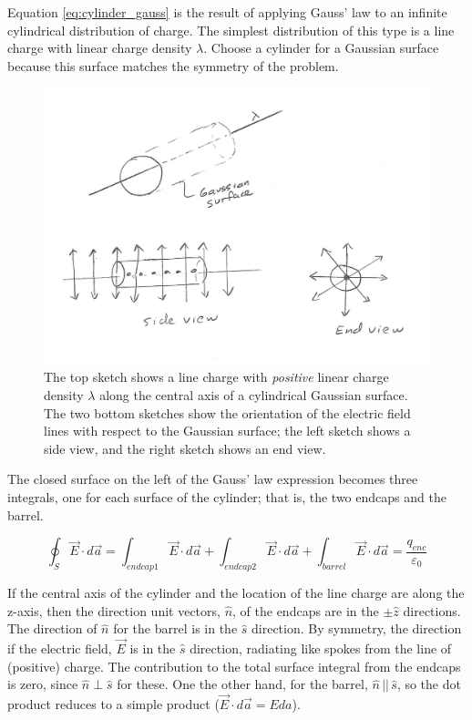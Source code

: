\documentclass[12pt]{article}
\begin{document}
\begin{flushleft}
Equation \ref{eq:cylinder_gauss} is the result of applying Gauss' law to an infinite cylindrical distribution of charge.  The simplest distribution of this type is a line charge with linear charge density $\lambda$.  Choose a cylinder for a Gaussian surface because this surface matches the symmetry of the problem.

\begin{figure}[h]
\centering
\includegraphics*[trim=1cm 0cm 0cm 0cm, clip=true, width=0.6\columnwidth]{linecharge.png}
\caption{\small The top sketch shows a line charge with {\it positive} linear charge density $\lambda$ along the central axis of a cylindrical Gaussian surface.  The two bottom sketches show the orientation of the electric field lines with respect to the Gaussian surface; the left sketch shows a side view, and the right sketch shows an end view.}
\label{fig:linecharge}
\end{figure}

The closed surface on the left of the Gauss' law expression becomes three integrals, one for each surface of the cylinder; that is, the two endcaps and the barrel.

\begin{equation*}
\oint_{S} \vec{E} \cdot d\vec{a} = \int_{endcap1} \vec{E} \cdot d\vec{a}+ \int_{endcap2} \vec{E} \cdot d\vec{a} + \int_{barrel} \vec{E} \cdot d\vec{a} =\frac{q_{enc}}{\varepsilon_{0}}
\end{equation*}

If the central axis of the cylinder and the location of the line charge are along the z-axis, then the direction unit  vectors, $\hat{n}$, of the endcaps are in the $\pm \hat{z}$ directions.  The direction of $\hat{n}$ for the barrel is in the $\hat{s}$ direction.  By symmetry, the direction if the electric field, $\vec{E}$ is in the $\hat{s}$ direction, radiating like spokes from the line of (positive) charge.  The contribution to the total surface integral from the endcaps is zero, since $\hat{n} \perp \hat{s}$ for these.  One the other hand, for the barrel, $\hat{n} \, || \, \hat{s}$, so the dot product reduces to a simple product ($\vec{E} \cdot d\vec{a} = Eda$).


\end{flushleft}
\end{document}
